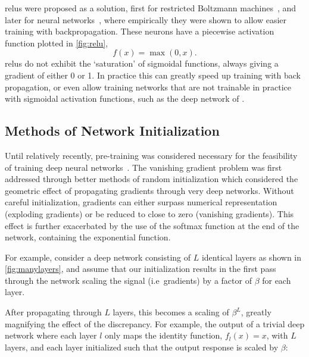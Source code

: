 \documentclass[thesis]{subfiles}
\begin{document}
\Glspl{relu} were proposed as a solution, first for restricted Boltzmann machines~\citep{conf/icml/NairH10}, and later for neural networks~\citep{glorot2010understanding}, where empirically they were shown to allow easier training with backpropagation. These neurons have a piecewise activation function plotted in \cref{fig:relu}, 
\begin{equation}
f(x) = \max(0,x).
\end{equation} 
\glspl{relu} do not exhibit the `saturation' of sigmoidal functions, always giving a gradient of either 0 or 1. In practice this can greatly speed up training with back propagation, or even allow training networks that are not trainable in practice with sigmoidal activation functions, such as the deep network of \citet{Krizhevsky2012}.

\subsection{Methods of Network Initialization}\label{ssec:init}
Until relatively recently, pre-training was considered necessary for the feasibility of training deep neural networks~\citep{hinton2006reducing}. The vanishing gradient problem was first addressed through better methods of random initialization which considered the geometric effect of propagating gradients through very deep networks. Without careful initialization, gradients can either surpass numerical representation (exploding gradients) or be reduced to close to zero (vanishing gradients). This effect is further exacerbated by the use of the softmax function at the end of the network, containing the exponential function.

For example, consider a deep network consisting of $L$ identical layers as shown in \cref{fig:manylayers}, and assume that our initialization results in the first pass through the network scaling the signal (i.e~gradients) by a factor of $\beta$ for each layer.

After propagating through $L$ layers, this becomes a scaling of $\beta^L$, greatly magnifying the effect of the discrepancy. For example, the output of a trivial deep network  where each layer $l$ only maps the identity function, $f_{l}(x) = x$, with $L$ layers, and each layer initialized such that the output response is scaled by $\beta$:
\end{document}
